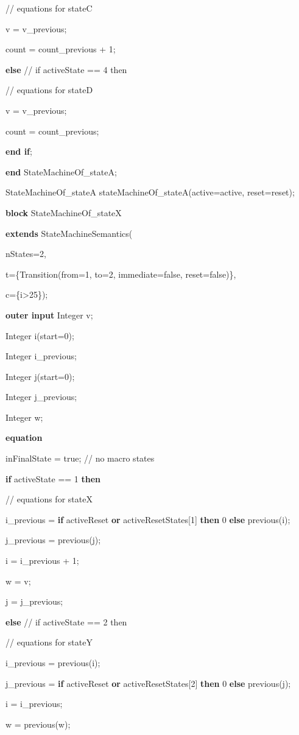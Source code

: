 \documentclass[10pt,a4paper]{report}
\begin{document}
// equations for stateC

v = v\_previous;

count = count\_previous + 1;

\textbf{else} // if activeState == 4 then

// equations for stateD

v = v\_previous;

count = count\_previous;

\textbf{end if};

\textbf{end} StateMachineOf\_stateA;

StateMachineOf\_stateA stateMachineOf\_stateA(active=active,
reset=reset);

\textbf{block} StateMachineOf\_stateX

\textbf{extends} StateMachineSemantics(

nStates=2,

t=\{Transition(from=1, to=2, immediate=false, reset=false)\},

c=\{i\textgreater{}25\});

\textbf{outer input} Integer v;

Integer i(start=0);

Integer i\_previous;

Integer j(start=0);

Integer j\_previous;

Integer w;

\textbf{equation }

inFinalState = true; // no macro states

\textbf{if} activeState == 1 \textbf{then}

// equations for stateX

i\_previous = \textbf{if} activeReset \textbf{or}
activeResetStates{[}1{]} \textbf{then} 0 \textbf{else} previous(i);

j\_previous = previous(j);

i = i\_previous + 1;

w = v;

j = j\_previous;

\textbf{else} // if activeState == 2 then

// equations for stateY

i\_previous = previous(i);

j\_previous = \textbf{if} activeReset \textbf{or}
activeResetStates{[}2{]} \textbf{then} 0 \textbf{else} previous(j);

i = i\_previous;

w = previous(w);
\end{document}
